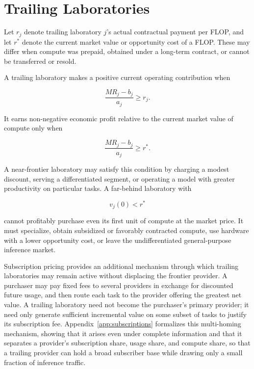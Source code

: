 \documentclass[11pt]{article}
\begin{document}
\section{Trailing Laboratories}
\label{sec:trailing-labs}

Let $r_j$ denote trailing laboratory $j$'s actual contractual payment per FLOP, and let $r^*$ denote the current market value or opportunity cost of a FLOP. These may differ when compute was prepaid, obtained under a long-term contract, or cannot be transferred or resold.

A trailing laboratory makes a positive current operating contribution when

\begin{equation}\frac{MR_j-b_j}{a_j}\geq r_j.\end{equation}

It earns non-negative economic profit relative to the current market value of compute only when

\begin{equation}\frac{MR_j-b_j}{a_j}\geq r^*.\end{equation}

A near-frontier laboratory may satisfy this condition by charging a modest discount, serving a differentiated segment, or operating a model with greater productivity on particular tasks. A far-behind laboratory with

\begin{equation}v_j(0)<r^*\end{equation}

cannot profitably purchase even its first unit of compute at the market price. It must specialize, obtain subsidized or favorably contracted compute, use hardware with a lower opportunity cost, or leave the undifferentiated general-purpose inference market.

Subscription pricing provides an additional mechanism through which trailing laboratories may remain active without displacing the frontier provider. A purchaser may pay fixed fees to several providers in exchange for discounted future usage, and then route each task to the provider offering the greatest net value. A trailing laboratory need not become the purchaser's primary provider; it need only generate sufficient incremental value on some subset of tasks to justify its subscription fee. Appendix~\ref{app:subscriptions} formalizes this multi-homing mechanism, showing that it arises even under complete information and that it separates a provider's subscription share, usage share, and compute share, so that a trailing provider can hold a broad subscriber base while drawing only a small fraction of inference traffic.
\end{document}
